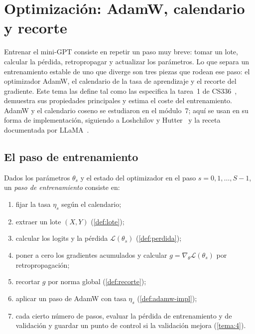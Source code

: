 \chapter{Optimización: AdamW, calendario y recorte}
\label{tema:3}

Entrenar el mini-GPT consiste en repetir un paso muy breve: tomar un lote, calcular la pérdida, retropropagar y actualizar los parámetros. Lo que separa un entrenamiento estable de uno que diverge son tres piezas que rodean ese paso: el optimizador AdamW, el calendario de la tasa de aprendizaje y el recorte del gradiente. Este tema las define tal como las especifica la tarea~1 de CS336~\cite[§4.2--4.5]{cs336}, demuestra sus propiedades principales y estima el coste del entrenamiento. AdamW y el calendario coseno se estudiaron en el módulo~7; aquí se usan en su forma de implementación, siguiendo a Loshchilov y Hutter~\cite{adamw,sgdr} y la receta documentada por LLaMA~\cite[§2.3]{llama}.

\section{El paso de entrenamiento}

\begin{definicion}\label{def:paso}
Dados los parámetros $\theta_{s}$ y el estado del optimizador en el paso $s=0,1,\dots,S-1$, un \emph{paso de entrenamiento} consiste en:
\begin{enumerate}[label=\arabic*.]
  \item fijar la tasa $\eta_s$ según el calendario;
  \item extraer un lote $(X,Y)$ (\cref{def:lote});
  \item calcular los logits y la pérdida $\mathcal{L}(\theta_s)$ (\cref{def:perdida});
  \item poner a cero los gradientes acumulados y calcular $g=\nabla_\theta\mathcal{L}(\theta_s)$ por retropropagación;
  \item recortar $g$ por norma global (\cref{def:recorte});
  \item aplicar un paso de AdamW con tasa $\eta_s$ (\cref{def:adamw-impl});
  \item cada cierto número de pasos, evaluar la pérdida de entrenamiento y de validación y guardar un punto de control si la validación mejora (\cref{tema:4}).
\end{enumerate}
\end{definicion}

